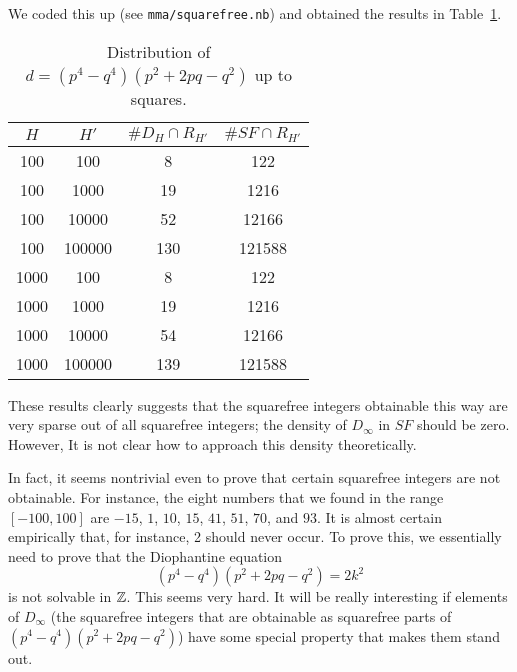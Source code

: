We coded this up (see \texttt{mma/squarefree.nb}) and obtained the
results in Table~\ref{tab:squarefree}.

\begin{table}[hbtp]
  \centering
  \begin{tabular}{| c | c | c | c |}
    \hline
    $H$ & $H'$ & $\# D_H \cap R_{H'}$ & $\# SF \cap R_{H'}$ \\ \hline
    100 & 100 & 8 & 122 \\ \hline
    100 & 1000 & 19 & 1216 \\ \hline
    100 & 10000 & 52 & 12166 \\ \hline
    100 & 100000 & 130 & 121588 \\ \hline
    1000 & 100 & 8 & 122 \\ \hline
    1000 & 1000 & 19 & 1216 \\ \hline
    1000 & 10000 & 54 & 12166 \\ \hline
    1000 & 100000 & 139 & 121588 \\ \hline
  \end{tabular}
  \caption{Distribution of $d = (p^4 - q^4)(p^2 + 2pq - q^2)$ up to
    squares.}
  \label{tab:squarefree}
\end{table}

These results clearly suggests that the squarefree integers obtainable
this way are very sparse out of all squarefree integers; the density
of $D_\infty$ in $SF$ should be zero. However, It is not clear how to
approach this density theoretically.

In fact, it seems nontrivial even to prove that certain squarefree
integers are not obtainable. For instance, the eight numbers that we
found in the range $[-100, 100]$ are $-15$, $1$, $10$, $15$, $41$,
$51$, $70$, and $93$. It is almost certain empirically that, for
instance, 2 should never occur. To prove this, we essentially need to
prove that the Diophantine equation
\[
(p^4 - q^4)(p^2 + 2pq - q^2) = 2 k^2
\]
is not solvable in $\mathbb{Z}$. This seems very hard. It will be really
interesting if elements of $D_\infty$ (the squarefree integers that
are obtainable as squarefree parts of $(p^4 - q^4)(p^2 + 2pq - q^2)$)
have some special property that makes them stand out.

